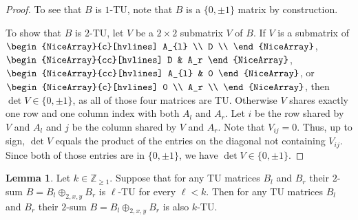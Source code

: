 \documentclass{article}
\theoremstyle{definition}
\newtheorem{lemma}[theorem]{Lemma}
\begin{document}
\begin{proof}
    To see that $B$ is $1$-TU, note that $B$ is a $\{0, \pm 1\}$ matrix by construction.

    To show that $B$ is $2$-TU, let $V$ be a $2 \times 2$ submatrix $V$ of $B$. If $V$ is a submatrix of $\begin{NiceArray}{c}[hvlines] A_{l} \\ D \\ \end{NiceArray}$, $\begin{NiceArray}{cc}[hvlines] D & A_r \end{NiceArray}$, $\begin{NiceArray}{cc}[hvlines] A_{l} & 0 \end{NiceArray}$, or  $\begin{NiceArray}{c}[hvlines] 0 \\ A_r \\ \end{NiceArray}$, then $\det V \in \{0, \pm 1\}$, as all of those four matrices are TU. Otherwise $V$ shares exactly one row and one column index with both $A_{l}$ and $A_{r}$. Let $i$ be the row shared by $V$ and $A_{l}$ and $j$ be the column shared by $V$ and $A_{r}$. Note that $V_{ij} = 0$. Thus, up to sign, $\det V$ equals the product of the entries on the diagonal not containing $V_{ij}$. Since both of those entries are in $\{0, \pm 1\}$, we have $\det V \in \{0, \pm 1\}$.
\end{proof}

\begin{lemma}\label{lem:two_sum_k_tu_induction}
    Let $k \in \mathbb{Z}_{\geq 1}$. Suppose that for any TU matrices $B_{l}$ and $B_{r}$ their $2$-sum $B = B_{l} \oplus_{2, x, y} B_{r}$ is $\ell$-TU for every $\ell < k$. Then for any TU matrices $B_{l}$ and $B_{r}$ their $2$-sum $B = B_{l} \oplus_{2, x, y} B_{r}$ is also $k$-TU.
\end{lemma}
\end{document}
